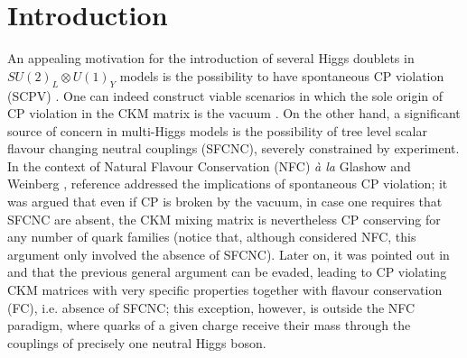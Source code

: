 \documentclass[12pt,a4paper]{article}
\begin{document}
\newpage
\section{Introduction\label{SEC:Intro}}
An appealing motivation for the introduction of several Higgs doublets in $SU(2)_L\otimes U(1)_Y$ models is the possibility to have spontaneous CP violation (SCPV) \cite{Lee:1973iz,Lee:1974jb}. One can indeed construct viable scenarios in which the sole origin of CP violation in the CKM matrix is the vacuum \cite{Nebot:2018nqn}. On the other hand, a significant source of concern in multi-Higgs models is the possibility of tree level scalar flavour changing neutral couplings (SFCNC), severely constrained by experiment. 
In the context of Natural Flavour Conservation (NFC) \emph{à la} Glashow and Weinberg \cite{Glashow:1976nt}, reference \cite{Branco:1979pv} addressed the implications of spontaneous CP violation; it was argued that even if CP is broken by the vacuum, in case one requires that SFCNC are absent, the CKM mixing matrix is nevertheless CP conserving for any number of quark families (notice that, although \cite{Branco:1979pv} considered NFC, this argument only involved the absence of SFCNC). Later on, it was pointed out in \cite{Ecker:1987md} and \cite{Gronau:1987xz} that the previous general argument can be evaded, leading to CP violating CKM matrices with very specific properties together with flavour conservation (FC), i.e. absence of SFCNC; this exception, however, is outside the NFC paradigm, where quarks of a given charge receive their mass through the couplings of precisely one neutral Higgs boson. 
\end{document}
